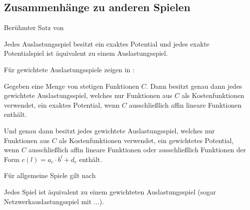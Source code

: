 \subsection{Zusammenhänge zu anderen Spielen}



Berühmter Satz von \cite{MonShap}

\begin{satz}
	Jedes Auslastungsspiel besitzt ein exaktes Potential und jedes exakte Potentialspiel ist äquivalent zu einem Auslastungsspiel.
\end{satz}

Für gewichtete Auslastungsspiele zeigen \citeauthor{CharExGewPotinWCG} in \cite{CharExGewPotinWCG}:

\begin{satz}
	Gegeben eine Menge von stetigen Funktionen $C$. Dann besitzt genau dann jedes gewichtete Auslastungsspiel, welches nur Funktionen aus $C$ als Kostenfunktionen verwendet, ein exaktes Potential, wenn $C$ ausschließlich affin lineare Funktionen enthält.
	
	Und genau dann besitzt jedes gewichtete Auslastungsspiel, welches nur Funktionen aus $C$ als Kostenfunktionen verwendet, ein gewichtetes Potential, wenn $C$ ausschließlich affin lineare Funktionen oder ausschließlich Funktionen der Form $c(l) = a_c\cdot b^l + d_c$ enthält.
\end{satz}

Für allgemeine Spiele gilt nach \cite{ReprOfFiniteGamesAsNCG}

\begin{satz}
	Jedes Spiel ist äquivalent zu einem gewichteten Auslastungsspiel (sogar Netzwerkauslastungsspiel mit ...).
\end{satz}
